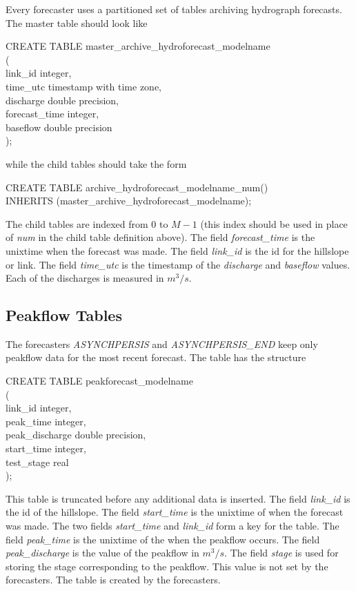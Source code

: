 \documentclass[12pt]{article}
\newenvironment{codeindent}
{\begin{list}{}
        {\setlength{\leftmargin}{.1in}}
        \item[]
}
{\end{list}}
\begin{document}
Every forecaster uses a partitioned set of tables archiving hydrograph forecasts. The master table should look like
\begin{codeindent}
CREATE TABLE master\_archive\_hydroforecast\_modelname \\
( \\
  link\_id integer, \\
  time\_utc timestamp with time zone, \\
  discharge double precision, \\
  forecast\_time integer, \\
  baseflow double precision \\
);
\end{codeindent}
while the child tables should take the form
\begin{codeindent}
CREATE TABLE archive\_hydroforecast\_modelname\_num() \\
INHERITS (master\_archive\_hydroforecast\_modelname);
\end{codeindent}
The child tables are indexed from 0 to $M-1$ (this index should be used in place of \emph{num} in the child table definition above). The field \emph{forecast\_time} is the unixtime when the forecast was made. The field \emph{link\_id} is the id for the hillslope or link. The field \emph{time\_utc} is the timestamp of the \emph{discharge} and \emph{baseflow} values. Each of the discharges is measured in $m^3/s$.

\subsection{Peakflow Tables} \label{sec: peakflow tables}

The forecasters \emph{ASYNCHPERSIS} and \emph{ASYNCHPERSIS\_END} keep only peakflow data for the most recent forecast. The table has the structure
\begin{codeindent}
CREATE TABLE peakforecast\_modelname \\
(\\
  link\_id integer, \\
  peak\_time integer, \\
  peak\_discharge double precision, \\
  start\_time integer, \\
  test\_stage real \\
);
\end{codeindent}
This table is truncated before any additional data is inserted. The field \emph{link\_id} is the id of the hillslope. The field \emph{start\_time} is the unixtime of when the forecast was made. The two fields \emph{start\_time} and \emph{link\_id} form a key for the table. The field \emph{peak\_time} is the unixtime of the when the peakflow occurs. The field \emph{peak\_discharge} is the value of the peakflow in $m^3/s$. The field \emph{stage} is used for storing the stage corresponding to the peakflow. This value is not set by the forecasters. The table is created by the forecasters.
\end{document}
